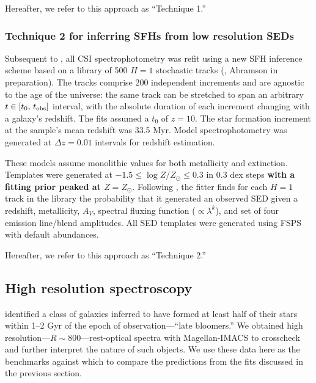 \documentclass[a4paper,fleqn,usenatbib]{mnras}
\newcommand{\logZ}{\log Z/Z_{\odot}}
\newcommand{\bfr}{\bf\color{red}}
\newcommand{\tobs}{t_{\rm obs}}
\begin{document}
Hereafter, we refer to this approach as ``Technique 1.''

\subsubsection{Technique 2 for inferring SFHs from low resolution SEDs}
\label{sec:h1}

Subsequent to \citet{Dressler18}, all CSI spectrophotometry was refit using a new 
SFH inference scheme based on a library of 500 $H=1$ stochastic tracks
(\citealt{Kelson14,Kelson16,Kelson20}, Abramson in preparation). The tracks comprise 200 
independent increments and are agnostic to the age of the universe: the same track can be stretched 
to span an arbitrary $t\in[t_{0},\,\tobs]$ interval, with the absolute duration of each increment 
changing with a galaxy's redshift. The fits assumed a $t_{0}$ of $z=10$. The star formation 
increment at the sample's mean redshift was 33.5 Myr. Model spectrophotometry was
generated at $\Delta z = 0.01$ intervals for redshift estimation.

These models assume monolithic values for both metallicity and extinction. Templates were generated
at $-1.5\leq\logZ\leq0.3$ in 0.3 dex steps {\bfr with a fitting prior peaked at $Z=Z_{\odot}$}. Following 
\citealt{Pacifici12}, the fitter finds for each $H=1$ track in the library the probability that it generated
an observed SED given a redshift, metallicity, $A_{V}$, spectral fluxing function 
({\bfr $\propto \lambda^{k}$}), and set of four emission line/blend amplitudes. All SED templates 
were generated using FSPS with default abundances.

Hereafter, we refer to this approach as ``Technique 2.''

\subsection{High resolution spectroscopy}
\label{sec:hiRes}

\citet{Dressler16, Dressler18} identified a class of galaxies inferred to have formed at least half of 
their stars within 1--2 Gyr of the epoch of observation---``late bloomers.'' We obtained high 
resolution---$R\sim800$---rest-optical spectra with Magellan-IMACS to crosscheck and further 
interpret the nature of such objects. We use these data here as the benchmarks against which to
compare the predictions from the fits discussed in the previous section.
\end{document}
